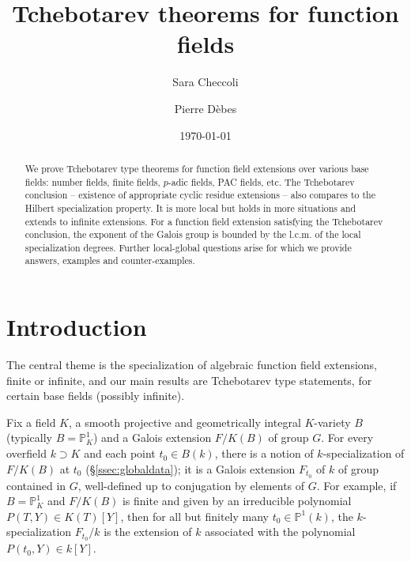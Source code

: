 \documentclass[12pt,english]{amsart}
\newtheorem{twisting lemma}[theorem]{Twisting lemma}
\begin{document}
\title[Tchebotarev theorems for function fields]{Tchebotarev theorems for function fields}

\author{Sara Checcoli}

\author{Pierre D\`ebes}



\address{Mathematisches Institut Universit\"at Basel, Rheinsprung 21,
CH-4051 Basel, Switzerland}

\address{Laboratoire Paul Painlev\'e, Math\'ematiques, Universit\'e 
Lille 1, 59655 Villeneuve d'Ascq Cedex, France}



\date{\today}

\begin{abstract} We prove Tchebotarev type theorems for function field extensions over various base fields: 
number fields, finite fields, $p$-adic fields, PAC fields, etc. The Tchebotarev conclusion -- existence of appropriate cyclic residue extensions -- also compares to the Hilbert specialization property. It is more local but holds in more situations and extends  to infinite extensions. For a function field extension satisfying the Tchebotarev conclusion, the exponent of the Galois group is bounded by the l.c.m. of the local specialization degrees. Further local-global questions arise for which we provide answers, examples and counter-examples.
\end{abstract}

\maketitle

\section{Introduction}

The central theme is the specialization of algebraic function field extensions, 
finite or infinite, and our main results are Tchebotarev type statements, for certain base fields (possibly infinite). 

Fix a field $K$,  a smooth projective and geometrically integral $K$-variety $B$ (typically $B={\mathbb{P}}^1_K$) and a Galois extension $F/K(B)$ of group $G$. For every overfield $k\supset K$ and each point $t_0\in B(k)$, there is a notion of $k$-specialization of  $F/K(B)$ at $t_0$ (\S \ref{ssec:globaldata}); it is a Galois extension $F_{t_0}$ of $k$ of group contained in $G$, well-defined up to conjugation by elements of $G$. For example, if $B={\mathbb{P}}^1_K$ and $F/K(B)$ is finite and given by an irreducible polynomial $P(T,Y)\in K(T)[Y]$, then for all but finitely many $t_0\in {\mathbb{P}}^1(k)$, the $k$-specialization $F_{t_0}/k$ is the extension of $k$ associated with the polynomial $P(t_0,Y)\in k[Y]$. 
\end{document}
